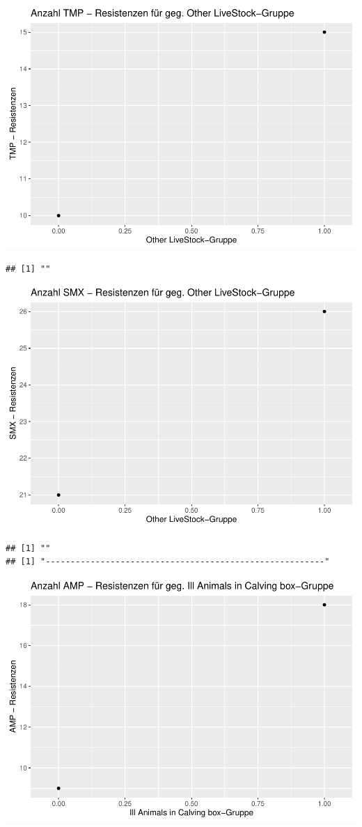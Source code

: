 \documentclass[
]{article}
\begin{document}
\includegraphics{NResistenzen_files/figure-latex/unnamed-chunk-7-19.pdf}

\begin{verbatim}
## [1] ""
\end{verbatim}

\includegraphics{NResistenzen_files/figure-latex/unnamed-chunk-7-20.pdf}

\begin{verbatim}
## [1] ""
## [1] "--------------------------------------------------------"
\end{verbatim}

\includegraphics{NResistenzen_files/figure-latex/unnamed-chunk-7-21.pdf}
\end{document}

